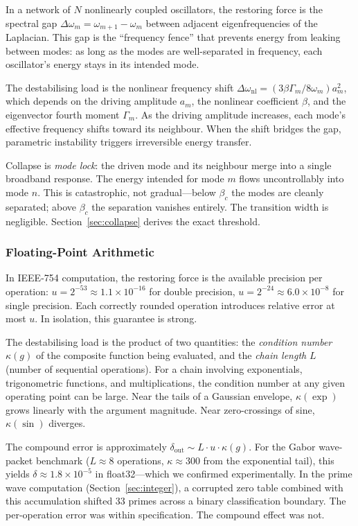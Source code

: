 \documentclass[10pt,twocolumn]{article}
\theoremstyle{definition}
\theoremstyle{remark}
\begin{document}
In a network of $N$ nonlinearly coupled oscillators, the restoring force is the spectral gap $\Delta\omega_m = \omega_{m+1} - \omega_m$ between adjacent eigenfrequencies of the Laplacian.  This gap is the ``frequency fence'' that prevents energy from leaking between modes: as long as the modes are well-separated in frequency, each oscillator's energy stays in its intended mode.

The destabilising load is the nonlinear frequency shift $\Delta\omega_{\mathrm{nl}} = (3\beta\Gamma_m / 8\omega_m) a_m^2$, which depends on the driving amplitude $a_m$, the nonlinear coefficient $\beta$, and the eigenvector fourth moment $\Gamma_m$.  As the driving amplitude increases, each mode's effective frequency shifts toward its neighbour.  When the shift bridges the gap, parametric instability triggers irreversible energy transfer.

Collapse is \emph{mode lock}: the driven mode and its neighbour merge into a single broadband response.  The energy intended for mode $m$ flows uncontrollably into mode $n$.  This is catastrophic, not gradual---below $\beta_c$ the modes are cleanly separated; above $\beta_c$ the separation vanishes entirely.  The transition width is negligible.  Section~\ref{sec:collapse} derives the exact threshold.

\subsubsection{Floating-Point Arithmetic}

In IEEE-754 computation, the restoring force is the available precision per operation: $u = 2^{-53} \approx 1.1 \times 10^{-16}$ for double precision, $u = 2^{-24} \approx 6.0 \times 10^{-8}$ for single precision.  Each correctly rounded operation introduces relative error at most $u$.  In isolation, this guarantee is strong.

The destabilising load is the product of two quantities: the \emph{condition number} $\kappa(g)$ of the composite function being evaluated, and the \emph{chain length} $L$ (number of sequential operations).  For a chain involving exponentials, trigonometric functions, and multiplications, the condition number at any given operating point can be large.  Near the tails of a Gaussian envelope, $\kappa(\exp)$ grows linearly with the argument magnitude.  Near zero-crossings of sine, $\kappa(\sin)$ diverges.

The compound error is approximately $\delta_{\mathrm{out}} \sim L \cdot u \cdot \kappa(g)$.  For the Gabor wave-packet benchmark ($L \approx 8$ operations, $\kappa \approx 300$ from the exponential tail), this yields $\delta \approx 1.8 \times 10^{-5}$ in float32---which we confirmed experimentally.  In the prime wave computation (Section~\ref{sec:integer}), a corrupted zero table combined with this accumulation shifted 33 primes across a binary classification boundary.  The per-operation error was within specification.  The compound effect was not.
\end{document}
